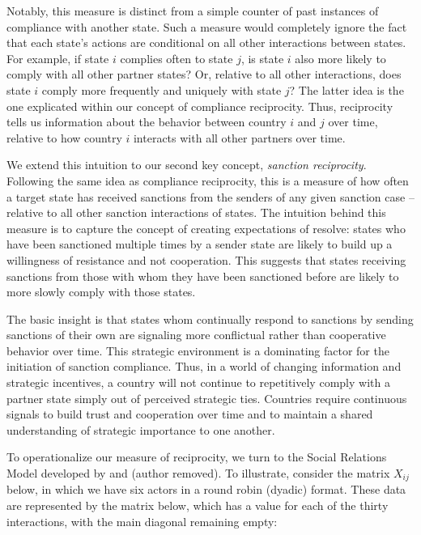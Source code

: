 Notably, this measure is distinct from a simple counter of past instances of compliance with another state. Such a measure would completely ignore the fact that each state's actions are conditional on all other interactions between states. For example, if state $i$ complies often to state $j$, is state $i$ also more likely to comply with all other partner states? Or, relative to all other interactions, does state $i$ comply more frequently and uniquely with state $j$? The latter idea is the one explicated within our  concept of compliance reciprocity. Thus, reciprocity tells us information about the behavior between country $i$ and $j$ over time, relative to how country $i$ interacts with all other partners over time. 



We extend this intuition to our second key concept, \textit{sanction reciprocity}. Following the same idea as compliance reciprocity, this is a measure of how often a target state has received sanctions from the senders of any given sanction case -- relative to all other sanction interactions of states. The intuition behind this measure is to capture the concept of creating expectations of resolve: states who have been sanctioned multiple times by a sender state are likely to build up a willingness of resistance and not cooperation. This suggests that states receiving sanctions from those with whom they have been sanctioned before are likely to more slowly comply with those states. 

The basic insight is that states whom continually respond to sanctions by sending sanctions of their own are signaling more conflictual rather than cooperative behavior over time. This strategic environment is a dominating factor for the initiation of sanction compliance. Thus, in a world of changing information and strategic incentives, a country will not continue to repetitively comply with a partner state simply out of perceived strategic ties. Countries require continuous signals to build trust and cooperation over time and to maintain a shared understanding of strategic importance to one another.





To operationalize our measure of reciprocity, we turn to the Social Relations Model developed by \citet{kenny1994interpersonal} and (author removed). To illustrate, consider the matrix $X_{ij}$ below, in which we have six actors in a round robin (dyadic) format. These data are represented by the matrix below, which has a value for each of the thirty interactions, with the main diagonal remaining empty:

